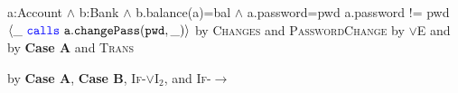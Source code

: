 \begin{proofexample}
{\begin{proofexample}
{{					{a:Account $\wedge$ b:Bank $\wedge$ b.balance(a)=bal $\wedge$ a.password=pwd}
					{a.password != pwd}
					{$\langle \_\ {\color{blue}\texttt{calls}}\ {\texttt{a}}.{\texttt{changePass}}({\texttt{pwd}}, \_) \rangle$}
					}
				{by \textsc{Changes} and \textsc{PasswordChange}}}
		{
				{by $\vee$E and }}
		{
				{by \textbf{Case A} and \textsc{Trans}}}
	\endproofsteps
	\end{proofexample}
	}
	{
			{by \textbf{Case A}, \textbf{Case B}, \textsc{If-}$\vee$I$_2$, and \textsc{If-}$\longrightarrow$}}
\endproofsteps
\end{proofexample}